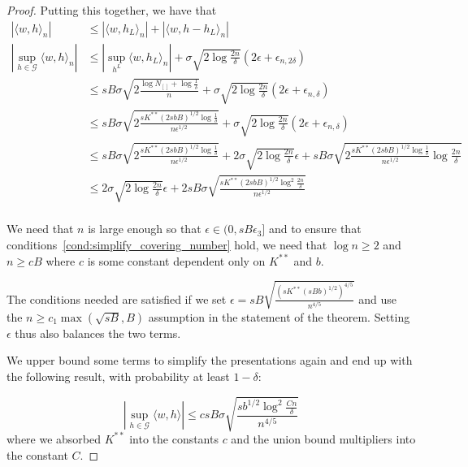 \begin{proof}
Putting this together, we have that
\begin{align*}
|\langle w, h \rangle_n | &\leq | \langle w, h_L\rangle_n| + |\langle w, h - h_L\rangle_n|\\
|\sup_{h \in \mathcal{G}} \langle w, h \rangle_n| &\leq 
     | \sup_{h^L} \langle w, h_L \rangle_n | + \sigma \sqrt{2 \log \frac{2n}{\delta}} (2\epsilon + \epsilon_{n, 2\delta}) \\
   &\leq   sB \sigma \sqrt{ 2 \frac{ \log N_{[]} + \log \frac{1}{\delta}}{n}} + \sigma \sqrt{2 \log \frac{2n}{\delta}} (2\epsilon + \epsilon_{n, \delta}) \\
   &\leq  sB \sigma \sqrt{ 2 \frac{sK^{**} (2sbB)^{1/2} \log \frac{1}{\delta}}{n \epsilon^{1/2}}} +
   \sigma \sqrt{ 2\log \frac{2n}{\delta}} (2\epsilon + \epsilon_{n, \delta}) \\
   &\leq sB \sigma \sqrt{ 2\frac{sK^{**} (2sbB)^{1/2} \log \frac{1}{\delta}}{n \epsilon^{1/2}}} +
   2\sigma\sqrt{2 \log \frac{2n}{\delta}} \epsilon + sB \sigma \sqrt{2 \frac{sK^{**} (2sbB)^{1/2}\log \frac{1}{\delta}}{n \epsilon^{1/2}} \log \frac{2n}{\delta}} \\
   &\leq 2\sigma\sqrt{2\log \frac{2n}{\delta}} \epsilon + 2 sB \sigma \sqrt{ \frac{sK^{**} (2sbB)^{1/2} \log^2 \frac{2n}{\delta}}{n \epsilon^{1/2}}} \\
\end{align*}

We need that $n$ is large enough so that $\epsilon \in (0, sB \epsilon_3]$ and to ensure that conditions~\ref{cond:simplify_covering_number} hold, we need that $\log n \geq 2$ and $n \geq c B$ where $c$ is some constant dependent only on $K^{**}$ and $b$.

The conditions needed are satisfied if we set $\epsilon = sB \sqrt{ \frac{(s K^{**} (sBb)^{1/2})^{4/5}}{n^{4/5}} }$ and use the $n \geq c_1 \max( \sqrt{sB}, B)$ assumption in the statement of the theorem. Setting $\epsilon$ thus also balances the two terms.


We upper bound some terms to simplify the presentations again and end up with the following result, with probability at least $1-\delta$:

\[
|\sup_{h \in \mathcal{G}} \langle w, h \rangle | \leq c sB \sigma \sqrt{ 
   \frac{s b^{1/2} \log^2 \frac{Cn}{\delta}}{n^{4/5}}}
\]
where we absorbed $K^{**}$ into the constants $c$ and the union bound multipliers into the constant $C$.



\end{proof}
